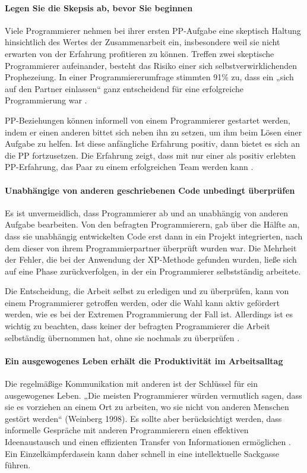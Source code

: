 \paragraph{ Legen Sie die Skepsis ab, bevor Sie beginnen} Viele Programmierer nehmen bei ihrer ersten PP-Aufgabe eine skeptisch Haltung hinsichtlich des Wertes der Zusammenarbeit ein, insbesondere weil sie nicht erwarten von der Erfahrung profitieren zu können. Treffen zwei skeptische Programmierer aufeinander, besteht das Risiko einer sich selbstverwirklichenden Prophezeiung. In einer Programmiererumfrage stimmten 91\% zu, dass ein „sich auf den Partner einlassen“ ganz entscheidend für eine erfolgreiche Programmierung war \cite{Williams2000AllKindergarten}.


PP-Beziehungen können informell von einem Programmierer gestartet werden, indem er einen anderen bittet sich neben ihn zu setzen, um ihm beim Lösen einer Aufgabe zu helfen. Ist diese anfängliche Erfahrung positiv, dann bietet es sich an die PP fortzusetzen. Die Erfahrung zeigt, dass mit nur einer als positiv erlebten PP-Erfahrung, das Paar zu einem erfolgreichen Team werden kann \cite{Williams2000AllKindergarten}.


\paragraph{ Unabhängige von anderen geschriebenen Code unbedingt überprüfen} Es ist unvermeidlich, dass Programmierer ab und an unabhängig von anderen Aufgabe bearbeiten. Von den befragten Programmierern, gab über die Hälfte an, dass sie unabhängig entwickelten Code erst dann in ein Projekt integrierten, nach dem dieser von ihrem Programmierpartner überprüft wurden war. Die Mehrheit der Fehler, die bei der Anwendung der XP-Methode gefunden wurden, ließe sich auf eine Phase zurückverfolgen, in der ein Programmierer selbstständig arbeitete.

Die Entscheidung, die Arbeit selbst zu erledigen und zu überprüfen, kann von einem Programmierer getroffen werden, oder die Wahl kann aktiv gefördert werden, wie es bei der Extremen Programmierung der Fall ist. Allerdings ist es wichtig zu beachten, dass keiner der befragten Programmierer die Arbeit selbständig übernommen hat, ohne sie nochmals zu überprüfen \cite{Williams2000AllKindergarten}.


\paragraph{ Ein ausgewogenes Leben erhält die Produktivität im Arbeitsalltag} Die regelmäßige Kommunikation mit anderen ist der Schlüssel für ein ausgewogenes Leben. „Die meisten Programmierer würden vermutlich sagen, dass sie es vorziehen an einem Ort zu arbeiten, wo sie nicht von anderen Menschen gestört werden“ (Weinberg 1998). Es sollte aber berücksichtigt werden, dass informelle Gespräche mit anderen Programmierern einen effektiven Ideenaustausch und einen effizienten Transfer von Informationen ermöglichen \cite{Williams2000AllKindergarten}. Ein Einzelkämpferdasein kann daher schnell in eine intellektuelle Sackgasse führen.

